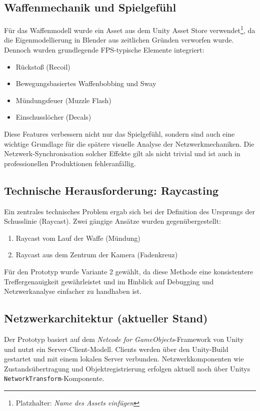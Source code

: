 \documentclass{article}
\begin{document}
\subsection{Waffenmechanik und Spielgefühl}
Für das Waffenmodell wurde ein Asset aus dem Unity Asset Store verwendet\footnote{Platzhalter: \textit{Name des Assets einfügen}}, da die Eigenmodellierung in Blender aus zeitlichen Gründen verworfen wurde. Dennoch wurden grundlegende FPS-typische Elemente integriert:

\begin{itemize}
  \item Rückstoß (Recoil)
  \item Bewegungsbasiertes Waffenbobbing und Sway
  \item Mündungsfeuer (Muzzle Flash)
  \item Einschusslöcher (Decals)
\end{itemize}

Diese Features verbessern nicht nur das Spielgefühl, sondern sind auch eine wichtige Grundlage für die spätere visuelle Analyse der Netzwerkmechaniken. Die Netzwerk-Synchronisation solcher Effekte gilt als nicht trivial und ist auch in professionellen Produktionen fehleranfällig.

\subsection{Technische Herausforderung: Raycasting}
Ein zentrales technisches Problem ergab sich bei der Definition des Ursprungs der Schusslinie (Raycast). Zwei gängige Ansätze wurden gegenübergestellt:

\begin{enumerate}
  \item Raycast vom Lauf der Waffe (Mündung)
  \item Raycast aus dem Zentrum der Kamera (Fadenkreuz)
\end{enumerate}

Für den Prototyp wurde Variante 2 gewählt, da diese Methode eine konsistentere Treffergenauigkeit gewährleistet und im Hinblick auf Debugging und Netzwerkanalyse einfacher zu handhaben ist.

\subsection{Netzwerkarchitektur (aktueller Stand)}
Der Prototyp basiert auf dem \textit{Netcode for GameObjects}-Framework von Unity und nutzt ein Server-Client-Modell. Clients werden über den Unity-Build gestartet und mit einem lokalen Server verbunden. Netzwerkkomponenten wie Zustandsübertragung und Objektregistrierung erfolgen aktuell noch über Unitys \texttt{NetworkTransform}-Komponente.
\end{document}
